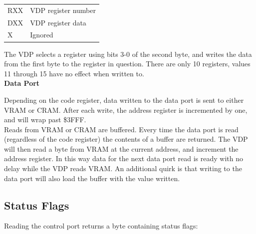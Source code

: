\documentclass{article}
\begin{document}

\begin{table}[H]
    \centering
    \begin{tabular}{l|l}
        \hline
        \hline
        RXX & VDP register number   \\
        DXX & VDP register data     \\
         X  & Ignored               \\
    \end{tabular}
\end{table}

The VDP selects a register using bits 3-0 of the second byte, and writes the
data from the first byte to the register in question. There are only 10
registers, values 11 through 15 have no effect when written to.
\\

\textbf{Data Port}

Depending on the code register, data written to the data port is sent to either
VRAM or CRAM. After each write, the address register is incremented by one, and
will wrap past \$3FFF.
\\

Reads from VRAM or CRAM are buffered. Every time the data port is read
(regardless of the code register) the contents of a buffer are returned. The
VDP will then read a byte from VRAM at the current address, and increment the
address register.  In this way data for the next data port read is ready with
no delay while the VDP reads VRAM. An additional quirk is that writing to the
data port will also load the buffer with the value written.

\subsection{Status Flags}

Reading the control port returns a byte containing status flags:
\end{document}
